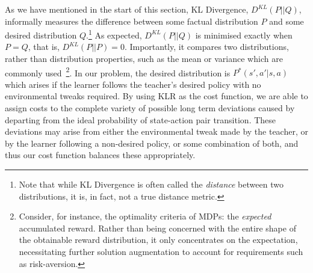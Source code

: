 As we have mentioned in the start of this section, KL Divergence,
$D^{KL}(P||Q)$, informally measures the difference between some
factual distribution $P$ and some desired distribution
$Q$.\footnote{Note that while KL Divergence is often called the
  \emph{distance} between two distributions, it is, in fact, not a
  true distance metric.}  As expected, $D^{KL}(P||Q)$ is minimised
exactly when $P=Q$, that is, $D^{KL}(P||P)=0$. Importantly, it
compares two distributions, rather than distribution properties, such
as the mean or variance which are commonly used~\footnote{Consider,
  for instance, the optimality criteria of MDPs: the {\em expected}
  accumulated reward. Rather than being concerned with the entire
  shape of the obtainable reward distribution, it only concentrates on the
  expectation, necessitating further solution augmentation to account
  for requirements such as risk-aversion.}. In our problem, the
desired distribution is $P^*(s',a'|s,a)$ which arises if the learner
follows the teacher's desired policy with no environmental tweaks
required.  By using KLR as the cost function, we are able to assign
costs to the complete variety of possible long term deviations caused
by departing from the ideal probability of state-action pair
transition.  These deviations may arise from either the environmental
tweak made by the teacher, or by the learner following a non-desired
policy, or some combination of both, and thus our cost function
balances these appropriately.





